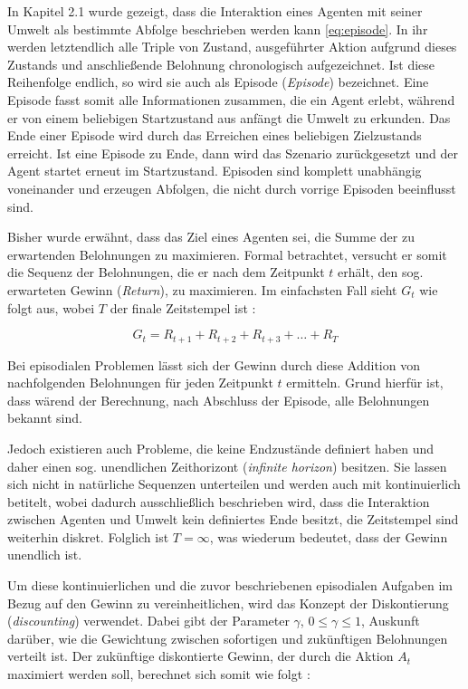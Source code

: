 In Kapitel 2.1 wurde gezeigt, dass die Interaktion eines Agenten mit seiner Umwelt als bestimmte Abfolge beschrieben werden kann \eqref{eq:episode}. In ihr werden letztendlich alle Triple von Zustand, ausgeführter Aktion aufgrund dieses Zustands und anschließende Belohnung chronologisch aufgezeichnet. Ist diese Reihenfolge endlich, so wird sie auch als Episode (\textit{Episode}) bezeichnet. Eine Episode fasst somit alle Informationen zusammen, die ein Agent erlebt, während er von einem beliebigen Startzustand aus anfängt die Umwelt zu erkunden. Das Ende einer Episode wird durch das Erreichen eines beliebigen Zielzustands erreicht. Ist eine Episode zu Ende, dann wird das Szenario zurückgesetzt und der Agent startet erneut im Startzustand. Episoden sind komplett unabhängig voneinander und erzeugen Abfolgen, die nicht durch vorrige Episoden beeinflusst sind.
\par
Bisher wurde erwähnt, dass das Ziel eines Agenten sei, die Summe der zu erwartenden Belohnungen zu maximieren. Formal betrachtet, versucht er somit die Sequenz der Belohnungen, die er nach dem Zeitpunkt $t$ erhält, den sog. erwarteten Gewinn (\textit{Return}), zu maximieren. Im einfachsten Fall sieht $G_t$ wie folgt aus, wobei $T$ der finale Zeitstempel ist \cite[S.55]{Sutton1998}:

\begin{equation}\label{eq:simpleReturn}
    G_t = R_{t+1} + R_{t+2} + R_{t+3} + \dots + R_{T}
\end{equation}

Bei episodialen Problemen lässt sich der Gewinn durch diese Addition von nachfolgenden Belohnungen für jeden Zeitpunkt $t$ ermitteln. Grund hierfür ist, dass wärend der Berechnung, nach Abschluss der Episode, alle Belohnungen bekannt sind. 
\par 
Jedoch existieren auch Probleme, die keine Endzustände definiert haben und daher einen sog. unendlichen Zeithorizont (\textit{infinite horizon}) besitzen. Sie lassen sich nicht in natürliche Sequenzen unterteilen und werden auch mit \glqq kontinuierlich\grqq{} betitelt, wobei dadurch ausschließlich beschrieben wird, dass die Interaktion zwischen Agenten und Umwelt kein definiertes Ende besitzt, die Zeitstempel sind weiterhin diskret. Folglich ist $T=\infty$, was wiederum bedeutet, dass der Gewinn unendlich ist.
\par 
Um diese kontinuierlichen und die zuvor beschriebenen episodialen Aufgaben im Bezug auf den Gewinn zu vereinheitlichen, wird das Konzept der Diskontierung (\textit{discounting}) verwendet. Dabei gibt der Parameter $\gamma$, $0\leq \gamma \leq 1$, Auskunft darüber, wie die Gewichtung zwischen sofortigen und zukünftigen Belohnungen verteilt ist. Der zukünftige diskontierte Gewinn, der durch die Aktion $A_t$ maximiert werden soll, berechnet sich somit wie folgt \cite[S.55]{Sutton1998}:

